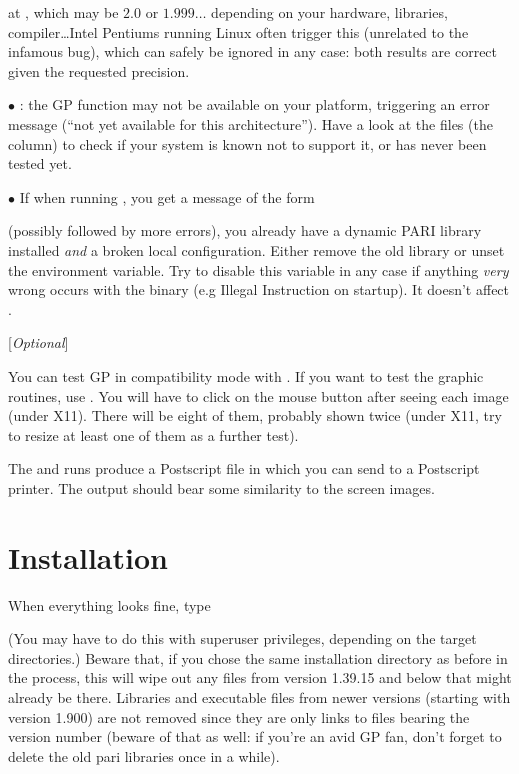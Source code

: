 
\noindent at , which may be $2.0$ or $1.999\dots$ depending on
your hardware, libraries, compiler\dots Intel Pentiums running Linux often
trigger this  (unrelated to the infamous  bug), which
can safely be ignored in any case: both results are correct given the
requested precision.

$\bullet$ : the GP function  may not be available on
your platform, triggering an error message (``not yet available for this
architecture''). Have a look at the  files (the 
column) to check if your system is known not to support it, or has never
been tested yet.

$\bullet$ If when running , you get a message of the form


\noindent (possibly followed by more errors), you already have a dynamic PARI
library installed {\it and\/} a broken local configuration. Either remove the
old library or unset the  environment variable. Try to
disable this variable in any case if anything {\it very} wrong occurs with
the  binary (e.g Illegal Instruction on startup). It doesn't
affect .

 [{\sl Optional\/}]

You can test GP in compatibility mode with . If you
want to test the graphic routines, use . You will
have to click on the mouse button after seeing each image (under X11).
There will be eight of them, probably shown twice (under X11, try to resize
at least one of them as a further test).

The  and  runs produce a Postscript
file  in  which you can send to a Postscript
printer. The output should bear some similarity to the screen images.

\section{Installation} When everything looks fine, type


\noindent (You may have to do this with superuser privileges, depending on
the target directories.) Beware that, if you chose the same installation
directory as before in the  process, this will wipe out any
files from version 1.39.15 and below that might already be there. Libraries
and executable files from newer versions (starting with version 1.900) are
not removed since they are only links to files bearing the version number
(beware of that as well: if you're an avid GP fan, don't forget to delete the
old pari libraries once in a while).

